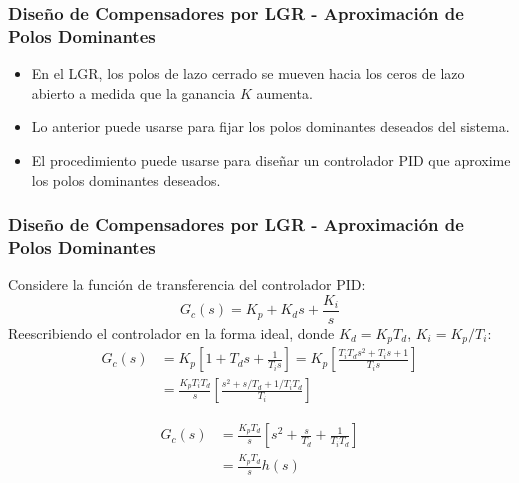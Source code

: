 \documentclass[aspectratio=169,handout]{beamer}
\theoremstyle{definition}
\theoremstyle{plain}
\theoremstyle{remark}
\begin{document}
\begin{frame}[c]\frametitle{Diseño de Compensadores por LGR - Aproximación de Polos Dominantes}
	\begin{itemize}
		\item En el LGR, los polos de lazo cerrado se mueven hacia los ceros de lazo abierto a medida que la ganancia $K$ aumenta.
		\item Lo anterior puede usarse para fijar los polos dominantes deseados del sistema.
		\item El procedimiento puede usarse para diseñar un controlador PID que aproxime los polos dominantes deseados.
	\end{itemize}
\end{frame}

\begin{frame}[c]\frametitle{Diseño de Compensadores por LGR - Aproximación de Polos Dominantes}
	Considere la función de transferencia del controlador PID:
	\begin{equation*}
		G_c(s) = K_p + K_d s + \frac{K_i}{s}
	\end{equation*}
	Reescribiendo el controlador en la forma ideal, donde $K_d = K_p T_d$, $K_i = K_p/T_i$:
	\begin{align*}
		G_c(s) &= K_p \left[1 + T_d s + \frac{1}{T_i s} \right] = K_p \left[ \frac{T_i T_d s^2 + T_i s + 1}{T_i s} \right]\\
		&= \frac{K_p T_i T_d}{s} \left[\frac{s^2 + s/T_d + 1/T_i T_d}{T_i} \right]
	\end{align*}
		
	\begin{align}
		G_c(s) &= \frac{K_p T_d}{s} \left[s^2 + \frac{s}{T_d} + \frac{1}{T_i T_d} \right]\nonumber\\
		&= \frac{K_p T_d}{s} h(s)\label{eq:pid_titd}
	\end{align}
\end{frame}
\end{document}
